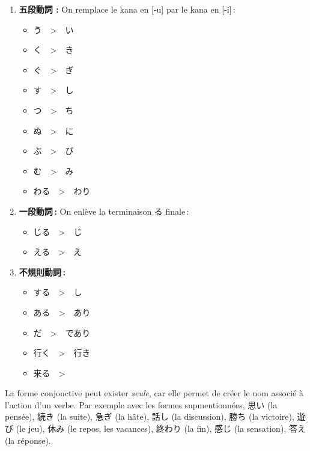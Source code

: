 \begin{enumerate}
    \item \textbf{五段動詞  :} On remplace le kana en [-u] par le kana en [-i] :
        \begin{itemize}
            \item {}う　>　い
            \item {}く　>　き
            \item {}ぐ　>　ぎ
            \item {}す　>　し
            \item {}つ　>　ち
            \item {}ぬ　>　に
            \item {}ぶ　>　び
            \item {}む　>　み
            \item {}わる　>　わり
        \end{itemize}

    \item \textbf{一段動詞 :} On enlève la terminaison る finale :
          \begin{itemize}
              \item {}じる　>　じ
              \item {}える　>　え
          \end{itemize}
    \item \textbf{不規則動詞 :}
          \begin{itemize}
              \item する　>　し
              \item ある　>　あり
              \item だ　>　であり
              \item 行く　>　行き
              \item 来る　>　
          \end{itemize}
\end{enumerate}

La forme conjonctive peut exister \textit{seule}, car elle permet de créer le nom associé à l'action d'un verbe. Par exemple avec les formes supmentionnées, 思い (la pensée), 続き (la suite), 急ぎ (la hâte), 話し (la discussion), 勝ち (la victoire), 遊び (le jeu), 休み (le repos, les vacances), 終わり (la fin), 感じ (la sensation), 答え (la réponse).

